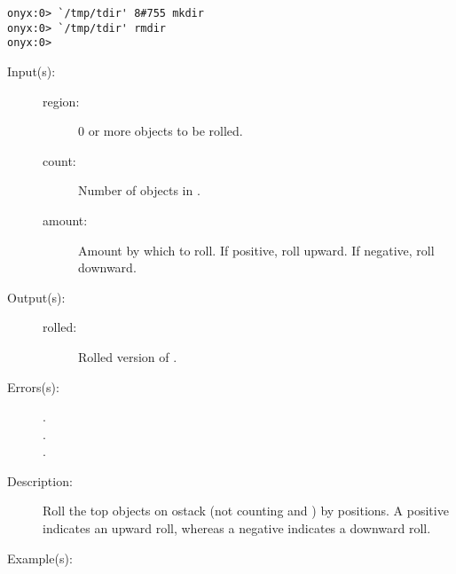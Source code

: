 \begin{description}
\begin{description}
\begin{verbatim}
onyx:0> `/tmp/tdir' 8#755 mkdir
onyx:0> `/tmp/tdir' rmdir
onyx:0>
		\end{verbatim}
	\end{description}
\label{systemdict:roll}
\item[{\onyxop{region count amount}{roll}{rolled}}: ]
	\begin{description}\item[]
	\item[Input(s): ]
		\begin{description}\item[]
		\item[region: ]
			0 or more objects to be rolled.
		\item[count: ]
			Number of objects in .
		\item[amount: ]
			Amount by which to roll.  If positive, roll
			upward.  If negative, roll downward.
		\end{description}
	\item[Output(s): ]
		\begin{description}\item[]
		\item[rolled: ]
			Rolled version of .
		\end{description}
	\item[Errors(s): ]
		\begin{description}\item[]
		\item[.]
		\item[.]
		\item[.]
		\end{description}
	\item[Description: ]
		Roll the top  objects on ostack (not counting
		 and ) by  positions.
		A positive  indicates an upward roll, whereas a
		negative  indicates a downward roll.
	\item[Example(s): ]\begin{verbatim}


\end{verbatim}
\end{description}
\end{description}
